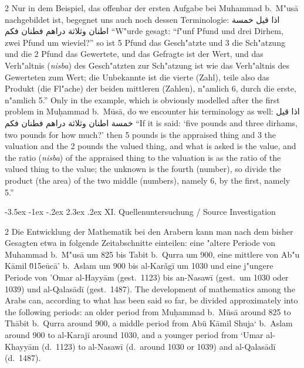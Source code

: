 \documentclass[10pt,a4paper]{article}
\makeatletter
\renewcommand{\switchcolumn}{\syncronize\nointerlineskip\columnbreak}
\newcommand{\RL}[1]{\beginR#1\endR}
\newcommand{\ar}[1]{{\arabicfont\RL{#1}}}
\renewcommand{\section}{\@startsection{section}{1}{\z@}%
  {-3.5ex \@plus -1ex \@minus -.2ex}%
  {2.3ex \@plus .2ex}%
  {\normalfont\Large\bfseries\color{sectioncolor}}}
\newcommand{\enquote}[1]{``#1''}
\makeatother
\begin{document}
\begin{paracol}{2}
Nur in dem Beispiel, das offenbar der ersten Aufgabe bei Muhammad b.\ M"us\=a nachgebildet ist, begegnet uns auch noch dessen Terminologie: \ar{اذا قيل خمسة اطنان وثلاثة دراهم فطنان فكم} \enquote{W"urde gesagt: \enquote{f"unf Pfund und drei Dirhem, zwei Pfund um wieviel?} so ist 5 Pfund das Gesch"atzte und 3 die Sch"atzung und die 2 Pfund das Gewertete, und das Gefragte ist der Wert, und das Verh"altnis (\textit{nisba}) des Gesch"atzten zur Sch"atzung ist wie das Verh"altnis des Gewerteten zum Wert; die Unbekannte ist die vierte (Zahl), teile also das Produkt (die Fl"ache) der beiden mittleren (Zahlen), n"amlich 6, durch die erste, n"amlich 5.}
\switchcolumn
Only in the example, which is obviously modelled after the first problem in Mu\d{h}ammad b.\ M\=us\=a, do we encounter his terminology as well: \ar{اذا قيل خمسة اطنان وثلاثة دراهم فطنان فكم} ``If it is said: `five pounds and three dirhams, two pounds for how much?' then 5 pounds is the appraised thing and 3 the valuation and the 2 pounds the valued thing, and what is asked is the value, and the ratio (\textit{nisba}) of the appraised thing to the valuation is as the ratio of the valued thing to the value; the unknown is the fourth (number), so divide the product (the area) of the two middle (numbers), namely 6, by the first, namely 5.''
\end{paracol}
\clearpage


\section{XI. Quellenuntersuchung / Source Investigation}

\begin{paracol}{2}
Die Entwicklung der Mathematik bei den Arabern kann man nach dem bisher Gesagten etwa in folgende Zeitabschnitte einteilen: eine "altere Periode von Muhammad b.\ M"us\=a um 825 bis Tabit b.\ Qurra um 900, eine mittlere von Ab"u K\=amil \u015e\=uc\=a' b.\ Aslam um 900 bis al-Kar\v{a}g\=i{} um 1030 und eine j"ungere Periode von 'Omar al-Hayy\=am (gest.\ 1123) bis an-Nasaw\={i} (gest.\ um 1030 oder 1039) und al-Qalas\=ad\={i} (gest.\ 1487).
\switchcolumn
The development of mathematics among the Arabs can, according to what has been said so far, be divided approximately into the following periods: an older period from Mu\d{h}ammad b.\ M\=us\=a around 825 to Th\=abit b.\ Qurra around 900, a middle period from Ab\"u K\=amil Shuja` b.\ Aslam around 900 to al-Karaj\={i} around 1030, and a younger period from `Umar al-Khayy\=am (d.\ 1123) to al-Nasaw\={i} (d.\ around 1030 or 1039) and al-Qalas\=ad\={i} (d.\ 1487).
\end{paracol}
\end{document}
